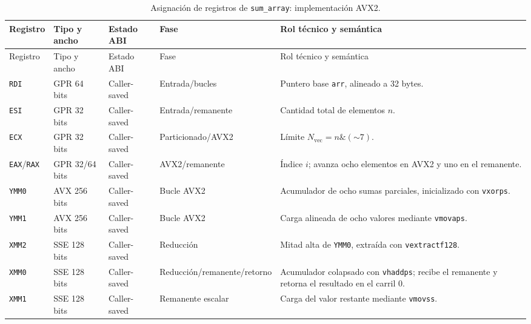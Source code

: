 \documentclass[journal]{IEEEtran}
\begin{document}
\begin{longtable}{@{}>{\raggedright\arraybackslash}p{}
  >{\raggedright\arraybackslash}p{}
  >{\raggedright\arraybackslash}p{}
  >{\raggedright\arraybackslash}p{}
  >{\raggedright\arraybackslash}p{}@{}}
\caption{Asignación de registros de \texttt{sum\_array}: implementación AVX2.}
\label{tab:sum-array-avx2-registers}\\
\toprule
Registro & Tipo y ancho & Estado ABI & Fase & Rol técnico y semántica \\
\midrule
\endfirsthead
\toprule
Registro & Tipo y ancho & Estado ABI & Fase & Rol técnico y semántica \\
\midrule
\endhead
\bottomrule
\endfoot
\texttt{RDI} & GPR 64 bits & Caller-saved & Entrada/bucles & Puntero base
  \texttt{arr}, alineado a 32 bytes. \\
\texttt{ESI} & GPR 32 bits & Caller-saved & Entrada/remanente & Cantidad total
  de elementos $n$. \\
\texttt{ECX} & GPR 32 bits & Caller-saved & Particionado/AVX2 & Límite
  $N_{\mathrm{vec}}=n\mathbin{\&}(\mathord{\sim}7)$. \\
\texttt{EAX}/\texttt{RAX} & GPR 32/64 bits & Caller-saved & AVX2/remanente &
  Índice $i$; avanza ocho elementos en AVX2 y uno en el remanente. \\
\texttt{YMM0} & AVX 256 bits & Caller-saved & Bucle AVX2 & Acumulador de
  ocho sumas parciales, inicializado con \texttt{vxorps}. \\
\texttt{YMM1} & AVX 256 bits & Caller-saved & Bucle AVX2 & Carga alineada
  de ocho valores mediante \texttt{vmovaps}. \\
\texttt{XMM2} & SSE 128 bits & Caller-saved & Reducción & Mitad alta de
  \texttt{YMM0}, extraída con \texttt{vextractf128}. \\
\texttt{XMM0} & SSE 128 bits & Caller-saved & Reducción/remanente/retorno &
  Acumulador colapsado con \texttt{vhaddps}; recibe el remanente y retorna el
  resultado en el carril 0. \\
\texttt{XMM1} & SSE 128 bits & Caller-saved & Remanente escalar & Carga del
  valor restante mediante \texttt{vmovss}. \\
\end{longtable}
\end{document}
